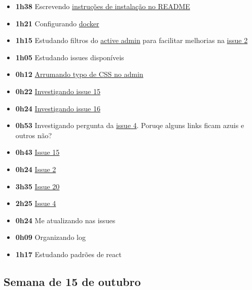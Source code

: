 \begin{itemize}
\tightlist
\item
  \textbf{1h38} Escrevendo
  \href{https://github.com/prefeiturasp/SME-plataforma-curriculo/pull/26}{instruções
  de instalação no README}
\item
  \textbf{1h21} Configurando \href{https://www.docker.com/}{docker}
\item
  \textbf{1h15} Estudando filtros do
  \href{https://activeadmin.info/}{active admin} para facilitar
  melhorias na
  \href{https://github.com/prefeiturasp/SME-plataforma-curriculo/issues/2}{issue
  2}
\item
  \textbf{1h05} Estudando issues disponíveis
\item
  \textbf{0h12}
  \href{https://github.com/prefeiturasp/SME-plataforma-curriculo-API/pull/52}{Arrumando
  typo de CSS no admin}
\item
  \textbf{0h22}
  \href{https://github.com/prefeiturasp/SME-plataforma-curriculo/issues/15}{Investigando
  issue 15}
\item
  \textbf{0h24}
  \href{https://github.com/prefeiturasp/SME-plataforma-curriculo/issues/16}{Investigando
  issue 16}
\item
  \textbf{0h53} Investigando pergunta da
  \href{https://github.com/prefeiturasp/SME-plataforma-curriculo/issues/4}{issue
  4}. Poruqe alguns links ficam azuis e outros não?
\item
  \textbf{0h43}
  \href{https://github.com/prefeiturasp/SME-plataforma-curriculo/issues/15}{Issue
  15}
\item
  \textbf{0h24}
  \href{https://github.com/prefeiturasp/SME-plataforma-curriculo/issues/2}{Issue
  2}
\item
  \textbf{3h35}
  \href{https://github.com/prefeiturasp/SME-plataforma-curriculo/issues/20}{Issue
  20}
\item
  \textbf{2h25}
  \href{https://github.com/prefeiturasp/SME-plataforma-curriculo/issues/4}{Issue
  4}
\item
  \textbf{0h24} Me atualizando nas issues
\item
  \textbf{0h09} Organizando log
\item
  \textbf{1h17} Estudando padrões de react
\end{itemize}

\hypertarget{semana-de-15-de-outubro}{%
\subsection{Semana de 15 de outubro}\label{semana-de-15-de-outubro}}


